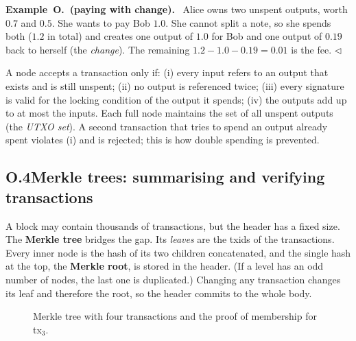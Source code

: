 \documentclass[11pt,a4paper]{article}
\newcounter{exn}[section]
\newcounter{oexn}
\renewcommand{\theoexn}{O.\arabic{oexn}}
\newenvironment{oexbox}[1][]{\par\medskip\refstepcounter{oexn}\noindent\textbf{Example~\theoexn\if\relax\detokenize{#1}\relax\else\ (#1)\fi.}\ \ignorespaces}{\hfill$\triangleleft$\par\medskip}
\theoremstyle{definition}
\theoremstyle{plain}
\theoremstyle{remark}
\newcommand{\Hash}{\mathsf{H}}
\begin{document}
\begin{oexbox}[paying with change]
Alice owns two unspent outputs, worth $0.7$ and $0.5$. She wants to pay Bob $1.0$. She cannot split a note, so she spends both ($1.2$ in total) and creates one output of $1.0$ for Bob and one output of $0.19$ back to herself (the \emph{change}). The remaining $1.2-1.0-0.19=0.01$ is the fee.
\end{oexbox}

\noindent A node accepts a transaction only if: (i) every input refers to an output that exists and is still unspent; (ii) no output is referenced twice; (iii) every signature is valid for the locking condition of the output it spends; (iv) the outputs add up to at most the inputs. Each full node maintains the set of all unspent outputs (the \emph{UTXO set}). A second transaction that tries to spend an output already spent violates (i) and is rejected; this is how double spending is prevented.

\subsection*{O.4\quad Merkle trees: summarising and verifying transactions}
A block may contain thousands of transactions, but the header has a fixed size. The \textbf{Merkle tree} bridges the gap. Its \emph{leaves} are the txids of the transactions. Every inner node is the hash of its two children concatenated, and the single hash at the top, the \textbf{Merkle root}, is stored in the header. (If a level has an odd number of nodes, the last one is duplicated.) Changing any transaction changes its leaf and therefore the root, so the header commits to the whole body.

\begin{figure}[htbp]
\centering
{}
\caption{Merkle tree with four transactions and the proof of membership for tx$_3$.}
\end{figure}
\end{document}
